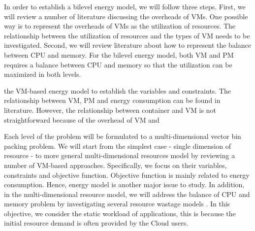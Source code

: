 \begin{enumerate}

	In order to establish a bilevel energy model, we will follow three steps. First, we will review a number of literature discussing the overheads of VMs. One possible way is to represent the overheads of VMs as the utilization of resources. The relationship between the utilization of resources and the types of VM needs to be investigated.  Second, we will review literature about how to represent the balance between CPU and memory. For the bilevel energy model, both VM and PM requires a balance between CPU and memory so that the utilization can be maximized in both levels.

	the VM-based energy model to establish the variables and constraints. The relationship between VM, PM and energy consumption can be found in literature. However, the relationship between container and VM is not straightforward because of the overhead of VM and 

	Each level of the problem will be formulated to a multi-dimensional vector bin packing problem. 
	We will start from the simplest case - single dimension of resource - to more general multi-dimensional resources model by reviewing a number of VM-based approaches. Specifically, we focus on their variables, constraints and objective function. Objective function is mainly related to energy consumption. Hence, energy model is another major issue to study. In addition, in the multi-dimensional resource model, we will address the balance of CPU and memory problem by investigating several resource wastage models \cite{Ferdaus:2014ep, Xu:2010vh, Gao:2013gg}. In this objective, we consider the static workload of applications, this is because the initial resource demand is often provided by the Cloud users.



\end{enumerate}
